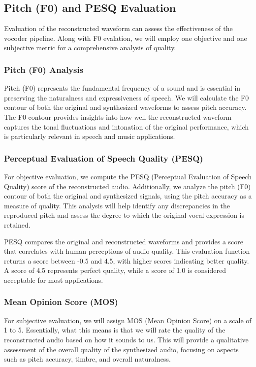 \documentclass{article}
\begin{document}
\subsection{Pitch (F0) and PESQ Evaluation}

Evaluation of the reconstructed waveform can assess the effectiveness of the vocoder pipeline. Along with F0 evalation, we will employ one objective and one subjective metric for a comprehensive analysis of quality.

\subsubsection{Pitch (F0) Analysis}

Pitch (F0) represents the fundamental frequency of a sound and is essential in preserving the naturalness and expressiveness of speech. We will calculate the F0 contour of both the original and synthesized waveforms to assess pitch accuracy. The F0 contour provides insights into how well the reconstructed waveform captures the tonal fluctuations and intonation of the original performance, which is particularly relevant in speech and music applications.

\subsubsection{Perceptual Evaluation of Speech Quality (PESQ)}

For objective evaluation, we compute the PESQ (Perceptual Evaluation of Speech Quality) score of the reconstructed audio. Additionally, we analyze the pitch (F0) contour of both the original and synthesized signals, using the pitch accuracy as a measure of quality. This analysis will help identify any discrepancies in the reproduced pitch and assess the degree to which the original vocal expression is retained.

PESQ compares the original and reconstructed waveforms and provides a score that correlates with human perceptions of audio quality. This evaluation function returns a score between -0.5 and 4.5, with higher scores indicating better quality. A score of 4.5 represents perfect quality, while a score of 1.0 is considered acceptable for most applications.

\subsubsection{Mean Opinion Score (MOS)}

For subjective evaluation, we will assign MOS (Mean Opinion Score) on a scale of 1 to 5. Essentially, what this means is that we will rate the quality of the reconstructed audio based on how it sounds to us. This will provide a qualitative assessment of the overall quality of the synthesized audio, focusing on aspects such as pitch accuracy, timbre, and overall naturalness.
\end{document}
